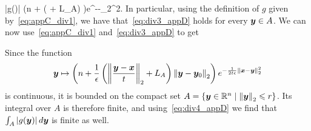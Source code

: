\beq\label{eq:div3_appD}
|g(\by)| \leqslant \left(n +  \left( + L_A\right) \right)e^{-\left\Vert \bx-\by\right\Vert _{2}^{2}}.
\eeq
In particular, using the definition of $g$ given by~\eqref{eq:appC_div1}, we have that~\eqref{eq:div3_appD} holds for every $\boldsymbol{y} \in A$. We can now use~\eqref{eq:appC_div1} and~\eqref{eq:div3_appD} to get
\beq\label{eq:div4_appD}
\eeq
Since the function
\[
\boldsymbol{y} \mapsto \left(n +  \frac{1}{\epsilon}\left(\left\Vert{\frac{\boldsymbol{y}- \boldsymbol{x}}{t}} \right\Vert_{2} + L_A\right)\left\Vert{\boldsymbol{y}-\boldsymbol{y}_0} \right\Vert_{2} \right)e^{-\frac{1}{2t\epsilon}\left\Vert \boldsymbol{x}-\boldsymbol{y}\right\Vert _{2}^{2}}
\]
is continuous, it is bounded on the compact set $A = \{\boldsymbol{y} \in \mathbb{R}^n \mid \left\Vert{\boldsymbol{y}} \right\Vert_{2} \leqslant r\}$. Its integral over $A$ is therefore finite, and using~\eqref{eq:div4_appD} we find that $\int_{A}|g(\boldsymbol{y})|\mathop{}\!d \boldsymbol{y}$ is finite as well.

